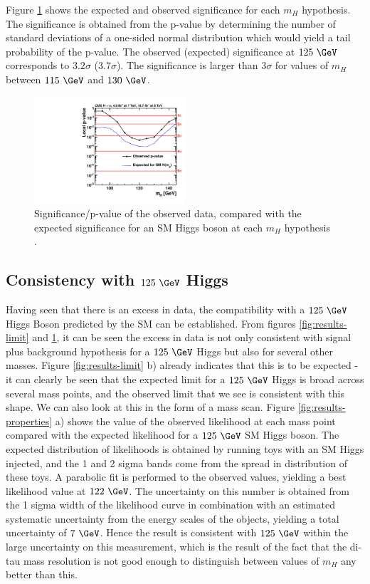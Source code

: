 Figure \ref{fig:results-pvalue} shows the expected and observed significance for
each $m_{H}$ hypothesis. The significance is obtained from the p-value by
determining the number of standard deviations of a one-sided normal distribution
which would yield a tail probability of the p-value. The observed (expected)
significance at $125~\GeV$ corresponds to $3.2\sigma$ ($3.7\sigma$). The
significance is larger than $3\sigma$ for values of $m_{H}$ between $115~\GeV$
and $130~\GeV$.

\begin{figure}[h!]
\includegraphics[width=0.5\textwidth]{plots/htt-sm/cmb_p-value.pdf}
\caption{Significance/p-value of the observed data, compared with the expected
significance for an \ac{SM} Higgs boson at each $m_{H}$ hypothesis
\cite{HIG-13-004}.}
\label{fig:results-pvalue}
\end{figure}

\subsection{Consistency with $125~\GeV$ Higgs}
\label{sec:consistency}

Having seen that there is an excess in data, the compatibility with a $125~\GeV$
Higgs Boson predicted by the \ac{SM} can be established. From figures
\ref{fig:results-limit} and \ref{fig:results-pvalue}, it can be seen the excess
in data is not only consistent with signal plus background hypothesis for a
$125~\GeV$ Higgs but also for several other masses. Figure
\ref{fig:results-limit} b) already indicates that this is to be expected - it
can clearly be seen that the expected limit for a $125~\GeV$ Higgs is broad
across several mass points, and the observed limit that we see is consistent
with this shape. We can also look at this in the form of a mass scan. Figure
\ref{fig:results-properties} a) shows the value of the observed likelihood at
each mass point compared with the expected likelihood for a $125~\GeV$ \ac{SM}
Higgs boson. The expected distribution of likelihoods is obtained by running
toys with an \ac{SM} Higgs injected, and the 1 and 2 sigma bands come from the
spread in distribution of these toys. A parabolic fit is performed to the
observed values, yielding a best likelihood value at $122~\GeV$. The uncertainty
on this number is obtained from the 1 sigma width of the likelihood curve in
combination with an estimated systematic uncertainty from the energy scales of
the objects, yielding a total uncertainty of $7~\GeV$. Hence the result is
consistent with $125~\GeV$ within the large uncertainty on this measurement,
which is the result of the fact that the di-tau mass resolution is not good
enough to distinguish between values of $m_{H}$ any better than this.

